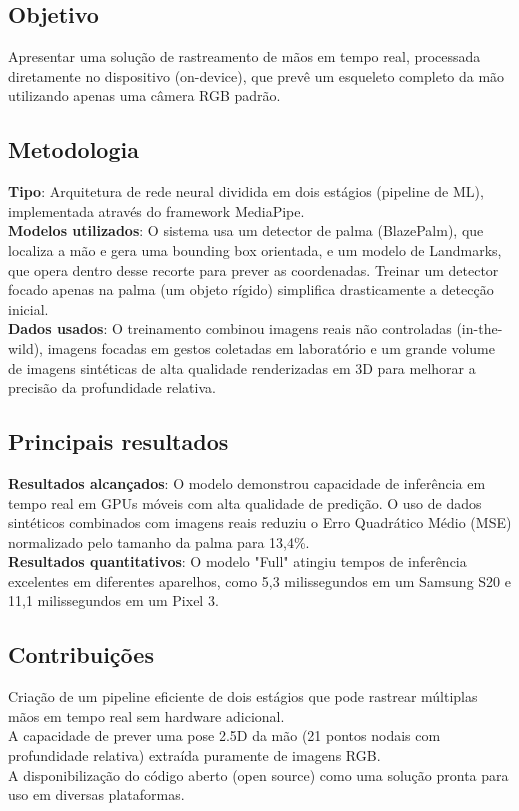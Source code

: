 \documentclass[12pt, a4paper]{article}
\begin{document}
\subsection{Objetivo}
Apresentar uma solução de rastreamento de mãos em tempo real, processada diretamente no dispositivo (on-device), que prevê um esqueleto completo da mão utilizando apenas uma câmera RGB padrão.\\
\subsection{Metodologia}
\textbf{Tipo}: Arquitetura de rede neural dividida em dois estágios (pipeline de ML), implementada através do framework MediaPipe.\\
\textbf{Modelos utilizados}: O sistema usa um detector de palma (BlazePalm), que localiza a mão e gera uma bounding box orientada, e um modelo de Landmarks, que opera dentro desse recorte para prever as coordenadas. Treinar um detector focado apenas na palma (um objeto rígido) simplifica drasticamente a detecção inicial.\\
\textbf{Dados usados}: O treinamento combinou imagens reais não controladas (in-the-wild), imagens focadas em gestos coletadas em laboratório e um grande volume de imagens sintéticas de alta qualidade renderizadas em 3D para melhorar a precisão da profundidade relativa.\\
\subsection{Principais resultados}
\textbf{Resultados alcançados}: O modelo demonstrou capacidade de inferência em tempo real em GPUs móveis com alta qualidade de predição. O uso de dados sintéticos combinados com imagens reais reduziu o Erro Quadrático Médio (MSE) normalizado pelo tamanho da palma para 13,4\%.\\
\textbf{Resultados quantitativos}: O modelo "Full" atingiu tempos de inferência excelentes em diferentes aparelhos, como 5,3 milissegundos em um Samsung S20 e 11,1 milissegundos em um Pixel 3.\\
\subsection{Contribuições}
Criação de um pipeline eficiente de dois estágios que pode rastrear múltiplas mãos em tempo real sem hardware adicional.\\
A capacidade de prever uma pose 2.5D da mão (21 pontos nodais com profundidade relativa) extraída puramente de imagens RGB.\\
A disponibilização do código aberto (open source) como uma solução pronta para uso em diversas plataformas.\\
\end{document}
